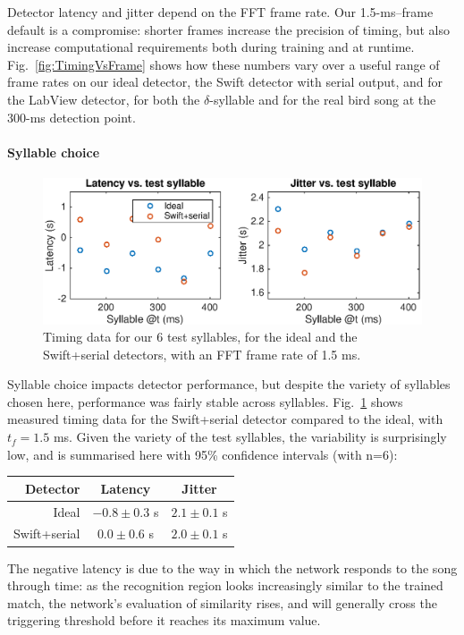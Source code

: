 \documentclass[10pt,letterpaper]{article}
\newcommand\fig[1]{Fig.~\ref{#1}}
\renewcommand{\subsubsection}[1]{\paragraph{#1}}
\begin{document}
Detector latency and jitter depend on the FFT frame rate.  Our 1.5-ms--frame default is a compromise: shorter frames increase the precision of timing, but also increase computational requirements both during training and at runtime.  \fig{fig:TimingVsFrame} shows how these numbers vary over a useful range of frame rates on our ideal detector, the Swift detector with serial output, and for the LabView detector, for both the $\delta$-syllable and for the real bird song at the 300-ms detection point.

\subsubsection{Syllable choice}

\begin{figure}
  \includegraphics[width=\textwidth]{TimingVsSyllable}
  \caption{Timing data for our 6 test syllables, for the ideal and the Swift+serial detectors, with an FFT frame rate of 1.5 ms.}
  \label{fig:TimingVsSyllable}
\end{figure}

Syllable choice impacts detector performance, but despite the variety of syllables chosen here, performance was fairly stable across syllables.  \fig{fig:TimingVsSyllable} shows measured timing data for the Swift+serial detector compared to the ideal, with $t_f=1.5$ ms.  Given the variety of the test syllables, the variability is surprisingly low, and is summarised here with 95\% confidence intervals (with n=6):
\vspace{8pt}\par\noindent
\begin{tabular}{r|cc}
  Detector & Latency & Jitter \\ 
  \hline   Ideal & $-0.8\pm 0.3$ s & $2.1\pm 0.1$ s \\
  Swift+serial & $0.0\pm 0.6$ s & $2.0\pm 0.1$ s
\end{tabular}
\vspace{8pt}\par\noindent
The negative latency is due to the way in which the network responds to the song through time: as the recognition region looks increasingly similar to the trained match, the network's evaluation of similarity rises, and will generally cross the triggering threshold before it reaches its maximum value.
\end{document}
